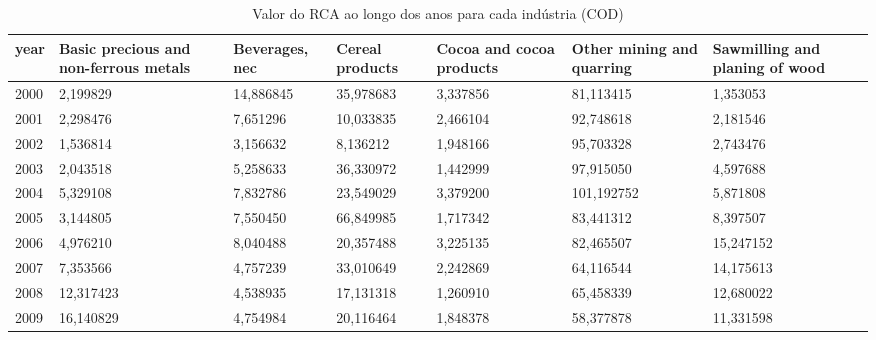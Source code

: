 \begin{table}
\centering
\caption{Valor do RCA ao longo dos anos para cada indústria (COD)}
\begin{tabular}{p{1cm}p{2cm}p{2cm}p{2cm}p{2cm}p{2cm}p{2cm}}
\toprule
 year &  Basic precious and non-ferrous metals &  Beverages, nec &  Cereal products &  Cocoa and cocoa products &  Other mining and quarring &  Sawmilling and planing of wood \\
\midrule
 2000 &                               2,199829 &       14,886845 &        35,978683 &                  3,337856 &                  81,113415 &                        1,353053 \\
 2001 &                               2,298476 &        7,651296 &        10,033835 &                  2,466104 &                  92,748618 &                        2,181546 \\
 2002 &                               1,536814 &        3,156632 &         8,136212 &                  1,948166 &                  95,703328 &                        2,743476 \\
 2003 &                               2,043518 &        5,258633 &        36,330972 &                  1,442999 &                  97,915050 &                        4,597688 \\
 2004 &                               5,329108 &        7,832786 &        23,549029 &                  3,379200 &                 101,192752 &                        5,871808 \\
 2005 &                               3,144805 &        7,550450 &        66,849985 &                  1,717342 &                  83,441312 &                        8,397507 \\
 2006 &                               4,976210 &        8,040488 &        20,357488 &                  3,225135 &                  82,465507 &                       15,247152 \\
 2007 &                               7,353566 &        4,757239 &        33,010649 &                  2,242869 &                  64,116544 &                       14,175613 \\
 2008 &                              12,317423 &        4,538935 &        17,131318 &                  1,260910 &                  65,458339 &                       12,680022 \\
 2009 &                              16,140829 &        4,754984 &        20,116464 &                  1,848378 &                  58,377878 &                       11,331598 \\

\end{tabular}
\end{table}
